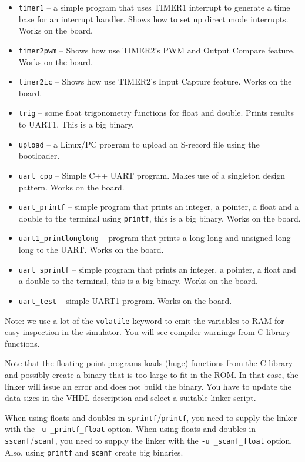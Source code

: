 \documentclass[12pt]{article}
\begin{document}
\begin{itemize}
\item \lstinline|timer1| -- a simple program that uses TIMER1 interrupt to generate a time base for an interrupt handler. Shows how to set up direct mode interrupts. Works on the board.
\item \lstinline|timer2pwm| -- Shows how use TIMER2's PWM and Output Compare feature. Works on the board.
\item \lstinline|timer2ic| -- Shows how use TIMER2's Input Capture feature. Works on the board.
\item \lstinline|trig| -- some float trigonometry functions for float and double. Prints results to UART1. This is a big binary.
\item \lstinline|upload| -- a Linux/PC program to upload an S-record file using the bootloader.
\item \lstinline|uart_cpp| -- Simple C++ UART program. Makes use of a singleton design pattern. Works on the board.
\item \lstinline|uart_printf| -- simple program that prints an integer, a pointer, a float and a double to the terminal using \lstinline|printf|, this is a big binary. Works on the board.
\item \lstinline|uart1_printlonglong| -- program that prints a long long and unsigned long long to the UART. Works on the board.
\item \lstinline|uart_sprintf| -- simple program that prints an integer, a pointer, a float and a double to the terminal, this is a big binary. Works on the board.
\item \lstinline|uart_test| -- simple UART1 program. Works on the board.
\end{itemize} 

Note: we use a lot of the \lstinline|volatile| keyword to emit the variables to RAM for easy inspection in the simulator. You will see compiler warnings from C library functions.

Note that the floating point programs loads (huge) functions from the C library and possibly create a binary that is too large to fit in the ROM. In that case, the linker will issue an error and does not build the binary. You have to update the data sizes in the VHDL description and select a suitable linker script.

When using floats and doubles in \lstinline|sprintf|/\lstinline|printf|, you need to supply the linker with the \lstinline|-u _printf_float| option. When using floats and doubles in \lstinline|sscanf|/\lstinline|scanf|, you need to supply the linker with the \lstinline|-u _scanf_float| option. Also, using \lstinline|printf| and \lstinline|scanf| create big binaries.
\end{document}
